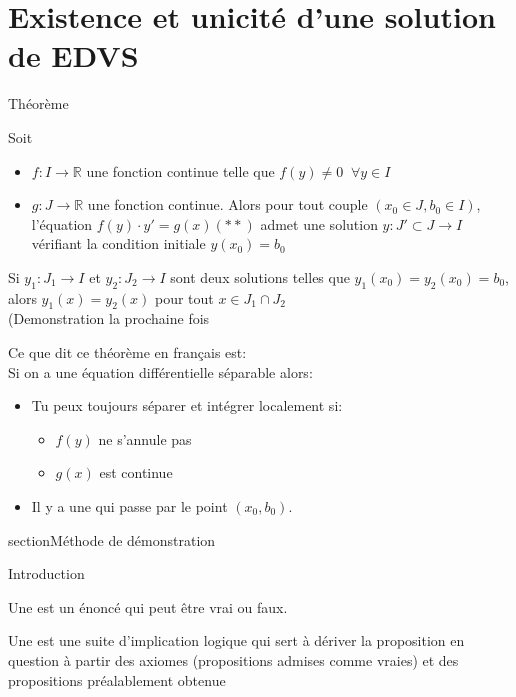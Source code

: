 \section{Existence et unicité d'une solution de EDVS}
\begin{parag}{Théorème}
    \begin{theoreme}
        Soit \begin{itemize}
            \item $f: I \to \mathbb{R}$ une fonction continue telle que $f(y) \neq 0\;\; \forall y \in I$
            \item $g : J \to \mathbb{R}$ une fonction continue. Alors pour tout couple $(x_0 \in J, b_0 \in I)$, l'équation $f(y)\cdot y' = g(x) (**)$ admet une solution $y : J' \subset J \to I$ vérifiant la condition initiale $y(x_0) = b_0$
        \end{itemize}
        Si $y_1 : J_1 \to I$ et $y_2 : J_2 \to I$ sont deux solutions telles que $y_1(x_0) = y_2(x_0) = b_0$, alors $y_1(x) = y_2(x)$ pour tout $x \in J_1 \cap J_2$
        \\
        (Demonstration la prochaine fois
        
    \end{theoreme}
    \begin{framedremark}
        Ce que dit ce théorème en français est:\\
        Si on a une équation différentielle séparable alors:\\
        \begin{itemize}
            \item Tu peux toujours séparer et intégrer localement si:
                \begin{itemize}
                    \item $f\left(y\right)$  ne s'annule pas
                    \item $g\left(x\right)$ est continue
                \end{itemize}
            \item Il y a une  qui passe par le point $\left(x_0, b_0\right)$.
        \end{itemize}
        
    \end{framedremark}
\end{parag}
section{Méthode de démonstration}
\begin{parag}{Introduction}
    \begin{definition}
        Une  est un énoncé qui peut être vrai ou faux.
    \end{definition}
    \begin{definition}
        Une  est une suite d'implication logique qui sert à dériver la proposition en question à partir des axiomes (propositions admises comme vraies) et des propositions préalablement obtenue
    \end{definition}
\end{parag}
